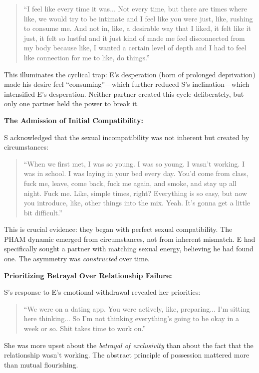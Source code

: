\documentclass[12pt,openany]{book}
\numberwithin{equation}{chapter}
\begin{document}
\begin{quote}
``I feel like every time it was... Not every time, but there are times where like, we would try to be intimate and I feel like you were just, like, rushing to consume me. And not in, like, a desirable way that I liked, it felt like it just, it felt so lustful and it just kind of made me feel disconnected from my body because like, I wanted a certain level of depth and I had to feel like connection for me to like, do things.''
\end{quote}

This illuminates the cyclical trap: E's desperation (born of prolonged deprivation) made his desire feel ``consuming''---which further reduced S's inclination---which intensified E's desperation. Neither partner created this cycle deliberately, but only one partner held the power to break it.

\textbf{The Admission of Initial Compatibility:}

S acknowledged that the sexual incompatibility was not inherent but created by circumstances:

\begin{quote}
``When we first met, I was so young. I was so young. I wasn't working. I was in school. I was laying in your bed every day. You'd come from class, fuck me, leave, come back, fuck me again, and smoke, and stay up all night. Fuck me. Like, simple times, right? Everything is so easy, but now you introduce, like, other things into the mix. Yeah. It's gonna get a little bit difficult.''
\end{quote}

This is crucial evidence: they began with perfect sexual compatibility. The PHAM dynamic emerged from circumstances, not from inherent mismatch. E had specifically sought a partner with matching sexual energy, believing he had found one. The asymmetry was \textit{constructed} over time.

\textbf{Prioritizing Betrayal Over Relationship Failure:}

S's response to E's emotional withdrawal revealed her priorities:

\begin{quote}
``We were on a dating app. You were actively, like, preparing... I'm sitting here thinking... So I'm not thinking everything's going to be okay in a week or so. Shit takes time to work on.''
\end{quote}

She was more upset about the \textit{betrayal of exclusivity} than about the fact that the relationship wasn't working. The abstract principle of possession mattered more than mutual flourishing.
\end{document}
